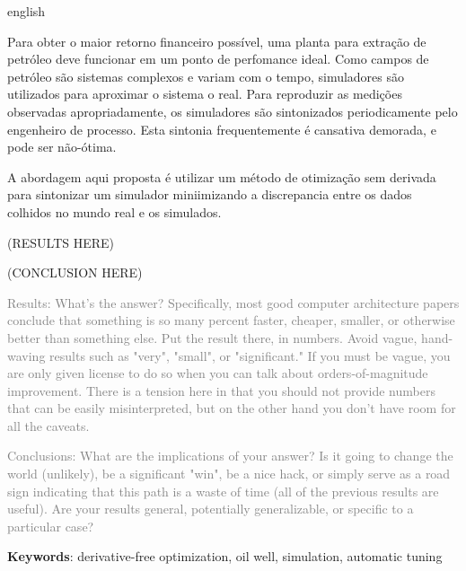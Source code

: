 \begin{resumo}[Abstract]
 \begin{otherlanguage*}{english}

Para obter o maior retorno financeiro possível, uma planta para extração de petróleo deve funcionar em um ponto de perfomance ideal. Como campos de petróleo são sistemas complexos e variam com o tempo, simuladores são utilizados para aproximar o sistema o real. Para reproduzir as medições observadas apropriadamente, os simuladores são sintonizados periodicamente pelo engenheiro de processo. Esta sintonia frequentemente é cansativa demorada, e pode ser não-ótima.

A abordagem aqui proposta é utilizar um método de otimização sem derivada para sintonizar um simulador miniimizando a discrepancia entre os dados colhidos no mundo real e os simulados.


(RESULTS HERE)

(CONCLUSION HERE)

\textcolor{gray}{
Results:
What's the answer? Specifically, most good computer architecture papers conclude that something is so many percent faster, cheaper, smaller, or otherwise better than something else. Put the result there, in numbers. Avoid vague, hand-waving results such as "very", "small", or "significant." If you must be vague, you are only given license to do so when you can talk about orders-of-magnitude improvement. There is a tension here in that you should not provide numbers that can be easily misinterpreted, but on the other hand you don't have room for all the caveats.}


\textcolor{gray}{
Conclusions:
What are the implications of your answer? Is it going to change the world (unlikely), be a significant "win", be a nice hack, or simply serve as a road sign indicating that this path is a waste of time (all of the previous results are useful). Are your results general, potentially generalizable, or specific to a particular case?
 }
   \vspace{\onelineskip}
 
   \noindent 
   \textbf{Keywords}: derivative-free optimization, oil well, simulation, automatic tuning
 \end{otherlanguage*}
\end{resumo}
